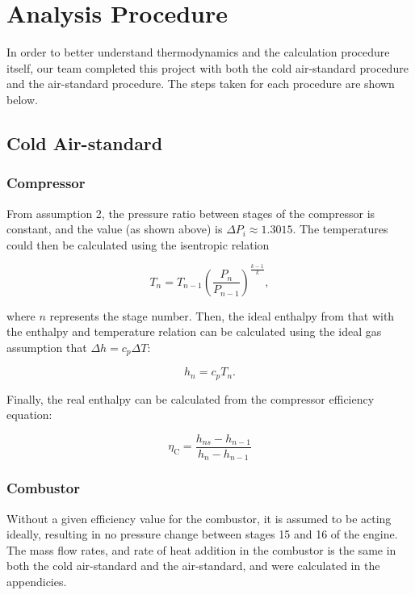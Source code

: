 \documentclass[11pt]{article} %
\begin{document}

\pagebreak
\section{Analysis Procedure}

In order to better understand thermodynamics and the calculation procedure itself, our team completed this project with both the cold air-standard procedure and the air-standard procedure. The steps taken for each procedure are shown below.

\subsection*{Cold Air-standard}
\subsubsection*{Compressor}
From assumption 2, the pressure ratio between stages of the compressor is constant, and the value (as shown above) is $\Delta P_i \approx 1.3015$. The temperatures could then be calculated using the isentropic relation

\begin{equation*}
T_{n} = T_{n-1}\left( \frac{P_n}{P_{n-1}} \right)^{ \frac{k-1}{k}},
\end{equation*}

\noindent where $n$ represents the stage number. Then, the ideal enthalpy from that with the enthalpy and temperature relation can be calculated using the ideal gas assumption that $\Delta h = c_p \Delta T$:

\begin{equation*}
h_{n} = c_pT_n.
\end{equation*}

\noindent Finally, the real enthalpy can be calculated from the compressor efficiency equation:

\begin{equation*}
\eta_{\text{C}} = \frac{ h_{ns} - h_{n-1} }{h_{n} - h_{n-1}}
\end{equation*}

\subsubsection*{Combustor}
Without a given efficiency value for the combustor, it is assumed to be acting ideally, resulting in no pressure change between stages 15 and 16 of the engine. The mass flow rates, and rate of heat addition in the combustor is the same in both the cold air-standard and the air-standard, and were calculated in the appendicies. \\
\end{document}

